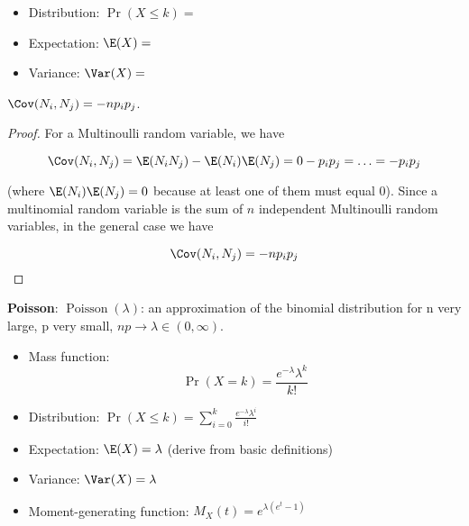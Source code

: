 \begin{itemize}
\begin{proof}
\[
\binom{n}{\mathcal{N}_1, \mathcal{N}_2, \ldots, \mathcal{N}_r} = \frac{n!}{\mathcal{N}_1! \mathcal{N}_2! \ldots \mathcal{N}_r!}
\]

Therefore the joint probability mass function for \(\boldsymbol{N}\) is 

\[
\Pr(\boldsymbol{N} = \boldsymbol{\mathcal{N}}) = \binom{n}{\mathcal{N}_1, \mathcal{N}_2, \ldots, \mathcal{N}_r} \prod_{i=1}^r p_i^{\mathcal{N}_i} = \frac{n!}{\mathcal{N}_1! \mathcal{N}_2! \ldots \mathcal{N}_r!}\prod_{i=1}^r p_i^{\mathcal{N}_i} 
\]

\end{proof}

\item Distribution: \(\Pr(X \leq k) =  \)

\item Expectation: \(\E(X) =  \)

\item Variance: \(\Var(X) = \)

\end{itemize}

\begin{proposition} \(\Cov(N_i, N_j) =  -np_ip_j \).

\end{proposition}

\begin{proof} For a Multinoulli random variable, we have 

\[
\Cov(N_i, N_j) = \E(N_iN_j) - \E(N_i)\E(N_j) =  0- p_i p_j = \ldots = -p_ip_j
\]

(where \(\E(N_i)\E(N_j) =0\) because at least one of them must equal 0). Since a multinomial random variable is the sum of \(n\) independent Multinoulli random variables, in the general case we have

\[
\Cov(N_i, N_j) = -np_ip_j
\]

\end{proof}

\textbf{Poisson}:  \(\operatorname{Poisson}(\lambda)\): an approximation of the binomial distribution for n very large, p very small, \(np \to \lambda \in (0, \infty)\).

\begin{itemize}

\item Mass function: \[\Pr(X = k) =  \frac{e^{-\lambda}\lambda^k}{k!} \]

\item Distribution: \(\Pr(X \leq k) = \sum_{i=0}^k  \frac{e^{-\lambda}\lambda^i}{i!}  \)

\item Expectation: \(\E(X) = \lambda \) (derive from basic definitions)

\item Variance: \(\Var(X) = \lambda\)

\item Moment-generating function: \(M_X(t) = e^{\lambda(e^t-1)}\)

\end{itemize}

